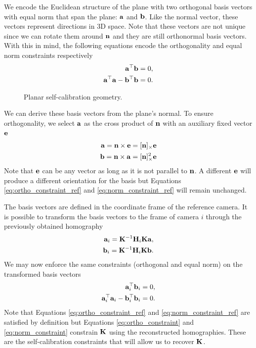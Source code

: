 \documentclass[10pt,twocolumn,letterpaper]{article}
\begin{document}
We encode the Euclidean structure of the plane with two orthogonal basis vectors with equal norm that span the plane: $\mathbf{a}$ and $\mathbf{b}$. Like the normal vector, these vectors represent directions in 3D space. Note that these vectors are not unique since we can rotate them around $\mathbf{n}$ and they are still orthonormal basis vectors. With this in mind, the following equations encode the orthogonality and equal norm constraints respectively
\begin{align}
\mathbf{a}^\top \mathbf{b} = 0, \label{eq:ortho_constraint_ref} \\
\mathbf{a}^\top \mathbf{a} - \mathbf{b}^\top \mathbf{b} = 0. \label{eq:norm_constraint_ref}
\end{align}

\begin{figure}

\caption{Planar self-calibration geometry.}
\end{figure}

We can derive these basis vectors from the plane's normal. To ensure orthogonality, we select $\mathbf{a}$ as the cross product of $\mathbf{n}$ with an auxiliary fixed vector $\mathbf{e}$
\begin{align}
\mathbf{a} = \mathbf{n} \times \mathbf{e} = [\mathbf{n}]_\times \mathbf{e} \\
\mathbf{b} = \mathbf{n} \times \mathbf{a} = [\mathbf{n}]_\times^2 \mathbf{e}
\end{align}
Note that $\mathbf{e}$ can be any vector as long as it is not parallel to $\mathbf{n}$. A different $\mathbf{e}$ will produce a different orientation for the basis but Equations \eqref{eq:ortho_constraint_ref} and \eqref{eq:norm_constraint_ref} will remain unchanged.

The basis vectors are defined in the coordinate frame of the reference camera. It is possible to transform the basis vectors to the frame of camera $i$ through the previously obtained homography
\begin{align}
\mathbf{a}_i = \mathbf{K}^{-1} \mathbf{H}_i \mathbf{K} \mathbf{a}, \\
\mathbf{b}_i = \mathbf{K}^{-1} \mathbf{H}_i \mathbf{K} \mathbf{b}.
\end{align}
%
We may now enforce the same constraints (orthogonal and equal norm) on the transformed basis vectors
\begin{align}
\mathbf{a}_i^\top \mathbf{b}_i = 0, \label{eq:ortho_constraint} \\
\mathbf{a}_i^\top \mathbf{a}_i - \mathbf{b}_i^\top \mathbf{b}_i = 0. \label{eq:norm_constraint} 
\end{align}
%
Note that Equations \eqref{eq:ortho_constraint_ref} and \eqref{eq:norm_constraint_ref} are satisfied by definition but Equations \eqref{eq:ortho_constraint} and \eqref{eq:norm_constraint} constrain $\mathbf{K}$ using the reconstructed homographies. These are the self-calibration constraints that will allow us to recover $\mathbf{K}$.
\end{document}

